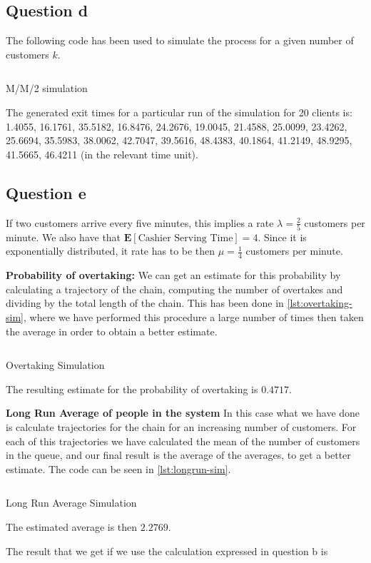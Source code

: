 \documentclass[11pt, a4paper]{article}
\begin{document}
\subsection*{Question d}
The following code has been used to simulate the process for a given number of customers $k$.

\begin{listing}[H]
	\inputminted[firstline = 143, lastline = 166]{R}{../main.R}
	\caption{M/M/2 simulation}
	\label{lst:mm2sim}
\end{listing}
The generated exit times for a particular run of the simulation for 20 clients is:  1.4055, 16.1761, 35.5182, 16.8476, 24.2676, 19.0045, 21.4588, 25.0099, 23.4262, 25.6694, 35.5983, 38.0062, 42.7047,
39.5616, 48.4383, 40.1864, 41.2149, 48.9295, 41.5665, 46.4211 (in the relevant time unit).

\subsection*{Question e}
If two customers arrive every five minutes, this implies a rate $\lambda = \frac{2}{5}$ customers per minute. We also have that $\mathbf{E}\left[ \text{Cashier Serving Time}\right] = 4$. Since it is exponentially distributed, it rate has to be then $\mu = \frac{1}{4}$ customers per minute.


\textbf{Probability of overtaking:} We can get an estimate for this probability by calculating a trajectory of the chain, computing the number of overtakes and dividing by the total length of the chain. This has been done in \cref{lst:overtaking-sim}, where we have performed this procedure a large number of times then taken the average in order to obtain a better estimate.
\begin{listing}[H]
	\inputminted[firstline = 175, lastline = 187]{R}{../main.R}
	\caption{Overtaking Simulation}
	\label{lst:overtaking-sim}
\end{listing}
The resulting estimate for the probability of overtaking is $0.4717$.

\textbf{Long Run Average of people in the system}
In this case what we have done is calculate trajectories for the chain for an increasing number of customers. For each of this trajectories we have calculated the mean of the number of customers in the queue, and our final result is the average of the averages, to get a better estimate. The code can be seen in \cref{lst:longrun-sim}.
\begin{listing}[H]
	\inputminted[firstline = 198, lastline = 203]{R}{../main.R}
	\caption{Long Run Average Simulation}
	\label{lst:longrun-sim}
\end{listing}
The estimated average is then $2.2769$.

The result that we get if we use the calculation expressed in question b is 
\end{document}
